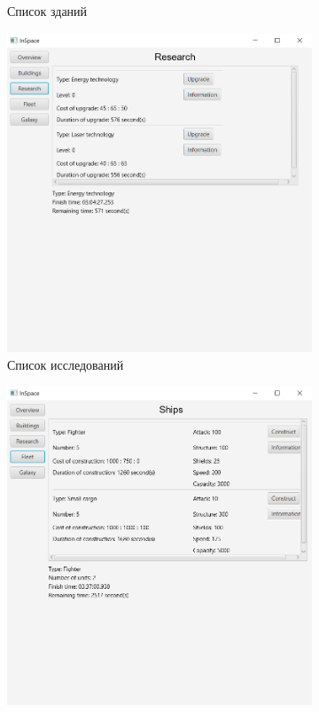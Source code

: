 \begin{figure}[H]
\begin{subfigure}[b]{0.4\textwidth}
\caption{Список зданий}
\end{subfigure}
\begin{subfigure}[b]{0.4\textwidth} 
\includegraphics[width=1\textwidth]{../screenshots/3.png}
\caption{Список исследований}
\end{subfigure}
\begin{subfigure}[b]{0.4\textwidth} 
\includegraphics[width=1\textwidth]{../screenshots/4.png}

\end{subfigure}
\end{figure}
